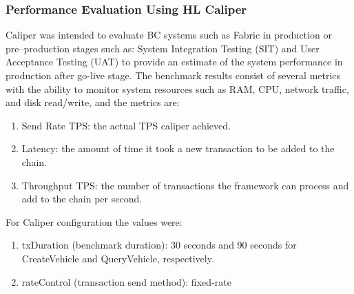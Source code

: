 \subsubsection{Performance Evaluation Using HL Caliper}\label{subsubsec:hlceval}
Caliper was intended to evaluate BC systems such as Fabric in production or pre–production stages such as: System Integration Testing (SIT)
and User Acceptance Testing (UAT) to provide an estimate of the system performance in production after go-live stage. The benchmark results
consist of several metrics with the ability to monitor system resources such as RAM, CPU, network traffic, and disk read/write, and the
metrics are:
\begin{enumerate}
	\item Send Rate TPS: the actual TPS caliper achieved.
	\item Latency: the amount of time it took a new transaction to be added to the chain.
	\item Throughput TPS: the number of transactions the framework can process and add to the chain per second.
\end{enumerate}
For Caliper configuration the values were:
\begin{enumerate}
	\item txDuration (benchmark duration): 30 seconds and 90 seconds for CreateVehicle and QueryVehicle, respectively.
	\item rateControl (transaction send method): fixed-rate
\end{enumerate}
